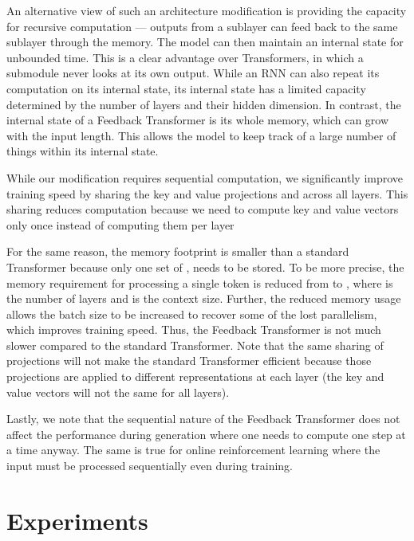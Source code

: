 \documentclass{article} \usepackage{iclr2021_conference}
\begin{document}
An alternative view of such an architecture modification is providing the capacity for recursive computation --- outputs from a sublayer can feed back to the same sublayer through the memory. 
The model can then maintain an internal state for unbounded time.
This is a clear advantage over Transformers, in which a submodule never looks at its own output.
While an RNN can also repeat its computation on its internal state, its  internal state has a limited capacity determined by the number of layers and their hidden dimension. 
In contrast, the internal state of a Feedback Transformer is its whole memory, which can grow with the input length. 
This allows the model to keep track of a large number of things within its internal state.

While our modification requires sequential computation, we significantly improve training speed by sharing the key and value projections  and  across all layers.
This sharing reduces computation because we need to compute key and value vectors only once instead of computing them per layer
 
For the same reason, the memory footprint is smaller than a standard Transformer because only one set of ,  needs to be stored.
To be more precise, the memory requirement for processing a single token is reduced from  to , where  is the number of layers and  is the context size.
Further, the reduced memory usage allows the batch size to be increased to recover some of the lost parallelism, which improves training speed.
Thus, the Feedback Transformer is not much slower compared to the standard Transformer. 
Note that the same sharing of projections will not make the standard Transformer efficient because those projections are applied to different representations at each layer (the key and value vectors will not the same for all layers).


Lastly, we note that the sequential nature of the Feedback Transformer does not affect the performance during generation where one needs to compute one step at a time anyway.
The same is true for online reinforcement learning where the input must be processed sequentially even during training. 












 \section{Experiments}
\end{document}
